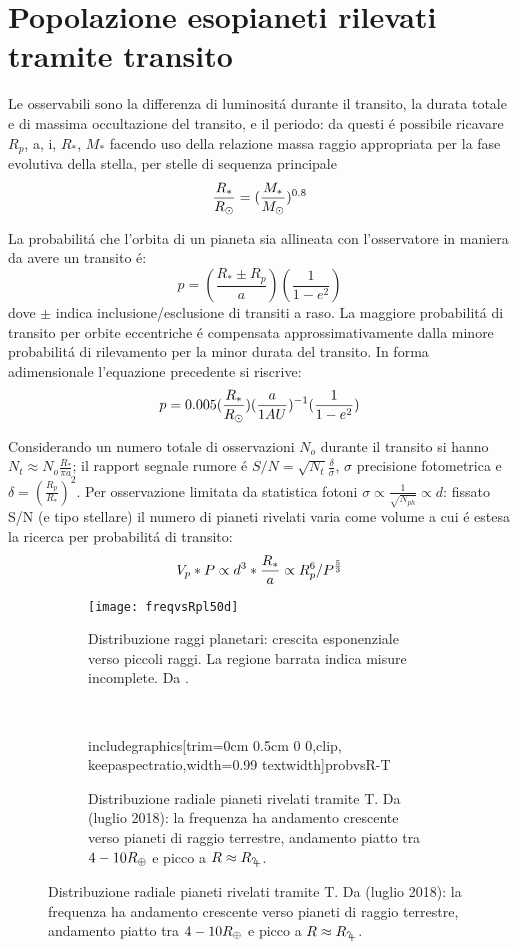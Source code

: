 \clearpage

\section{Popolazione esopianeti rilevati tramite transito}

Le osservabili sono la differenza di luminosit\'a durante il transito, la durata totale e di massima occultazione del transito, e il periodo: da questi \'e possibile ricavare $R_p$, a, i, $R_*$, $M_*$ facendo uso della relazione massa raggio appropriata per la fase evolutiva della stella, per stelle di sequenza principale
\begin{equation}
\frac{R_*}{R_{\odot}{}}=(\frac{M_*}{M_{\odot}{}})^{0.8}
\end{equation}

La probabilit\'a che l'orbita di un pianeta sia allineata con l'osservatore in maniera da avere un transito \'e:
\begin{equation}
p=(\frac{R_*\pm R_p}{a})(\frac{1}{1-e^2})
\end{equation}
dove $\pm$ indica inclusione/esclusione di transiti a raso.
La maggiore probabilit\'a di transito per orbite eccentriche \'e compensata approssimativamente dalla minore probabilit\'a di rilevamento per la minor durata del transito.
In forma adimensionale l'equazione precedente si riscrive:
\begin{equation}
p=0.005(\frac{R_*}{R_{\odot}{}})(\frac{a}{1AU})^{-1}(\frac{1}{1-e^2})
\end{equation}

Considerando un numero totale di osservazioni $N_o$ durante il transito si hanno $N_t\approx N_o\frac{R_*}{\pi a}$; il rapport segnale rumore \'e $S/N=\sqrt{N_t}\frac{\delta}{\sigma}$, $\sigma$ precisione fotometrica e $\delta=(\frac{R_p}{R_*})^2$. Per osservazione limitata da statistica fotoni $\sigma\propto\frac{1}{\sqrt{N_{ph}}}\propto d$: fissato S/N (e tipo stellare) il numero di pianeti rivelati varia come volume a cui \'e estesa la ricerca per probabilit\'a di transito:
\begin{equation}
V_p*P\propto d^3*\frac{R_*}{a}\propto R_p^6/P^{\frac{5}{3}}
\end{equation}

\begin{figure}[!ht]
\begin{subfigure}[b]{0.47\textwidth}
\centering
\texttt{[image: freqvsRpl50d]}
\caption{Distribuzione raggi planetari: crescita esponenziale verso piccoli raggi. La regione barrata indica misure incomplete. Da \cite{howard2012planet}.}\label{fig:howard2012planet}
\end{subfigure}
~
\begin{subfigure}[b]{0.5\textwidth} \centering includegraphics[trim={0cm 0.5cm 0 0},clip, keepaspectratio,width=0.99 textwidth]{probvsR-T}\caption{Distribuzione radiale pianeti rivelati tramite T. Da \cite{exoplanet.eu} (luglio 2018): la frequenza ha andamento crescente verso pianeti di raggio terrestre, andamento piatto tra $4-10R_{\oplus}{}$ e picco a $R\approx\rjupiter{}$.}\label{fig:probvsR-T}
\end{subfigure}
\end{figure}

